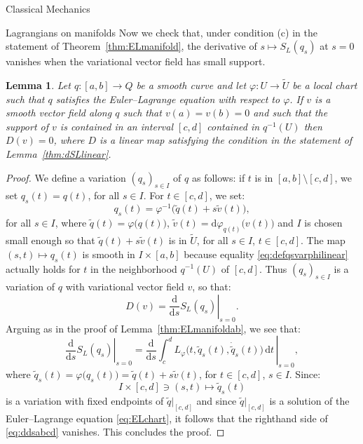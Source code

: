 \documentclass[oneside,a4paper,11pt]{amsbook}
\newcommand{\dd}{\mathrm d}
\theoremstyle{remark}\newtheorem{exercise}{Exercise}[chapter]
\theoremstyle{plain}\newtheorem{teo}{Theorem}[section]
\theoremstyle{plain}\newtheorem{lem}[teo]{Lemma}
\theoremstyle{plain}\newtheorem{prop}[teo]{Proposition}
\theoremstyle{plain}\newtheorem{cor}[teo]{Corollary}
\theoremstyle{definition}\newtheorem{defin}[teo]{Definition}
\theoremstyle{remark}\newtheorem{rem}[teo]{Remark}
\theoremstyle{definition}\newtheorem{notation}[teo]{Notation}
\theoremstyle{definition}\newtheorem{convention}[teo]{Convention}
\theoremstyle{definition}\newtheorem{example}[teo]{Example}
\numberwithin{section}{chapter}
\numberwithin{equation}{section}
\begin{document}
\begin{chapter}{Classical Mechanics}
\begin{section}{Lagrangians on manifolds}
Now we check that, under condition (c) in the statement of Theorem~\ref{thm:ELmanifold}, the derivative
of $s\mapsto S_L(q_s)$ at $s=0$ vanishes when the variational vector field has small support.
\begin{lem}\label{thm:dSsmallsupport}
Let $q:[a,b]\to Q$ be a smooth curve and let $\varphi:U\to\widetilde U$ be a local chart such that
$q$ satisfies the Euler--Lagrange equation with respect to $\varphi$. If $v$ is a smooth vector field along
$q$ such that $v(a)=v(b)=0$ and such that the support of $v$ is contained in an interval $[c,d]$ contained in $q^{-1}(U)$
then $D(v)=0$, where $D$ is a linear map satisfying the condition in the statement of Lemma~\ref{thm:dSLlinear}.
\end{lem}
\begin{proof}
We define a variation $(q_s)_{s\in I}$ of $q$ as follows: if $t$ is in $[a,b]\setminus[c,d]$, we set
$q_s(t)=q(t)$, for all $s\in I$. For $t\in[c,d]$, we set:
\begin{equation}\label{eq:defqsvarphilinear}
q_s(t)=\varphi^{-1}\big(\tilde q(t)+s\tilde v(t)\big),
\end{equation}
for all $s\in I$, where $\tilde q(t)=\varphi\big(q(t)\big)$, $\tilde v(t)=\dd\varphi_{q(t)}\big(v(t)\big)$ and $I$ is
chosen small enough so that $\tilde q(t)+s\tilde v(t)$ is in $\widetilde U$, for all $s\in I$, $t\in[c,d]$.
The map $(s,t)\mapsto q_s(t)$ is smooth in $I\times[a,b]$ because equality \eqref{eq:defqsvarphilinear} actually
holds for $t$ in the neighborhood $q^{-1}(U)$ of $[c,d]$. Thus $(q_s)_{s\in I}$ is a variation
of $q$ with variational vector field $v$, so that:
\[D(v)=\left.\frac{\dd}{\dd s}S_L(q_s)\right\vert_{s=0}.\]
Arguing as in the proof of Lemma~\ref{thm:ELmanifoldab}, we see that:
\begin{equation}\label{eq:ddsabcd}
\left.\frac{\dd}{\dd s}S_L(q_s)\right\vert_{s=0}=\left.\frac{\dd}{\dd s}
\int_c^dL_\varphi\big(t,\tilde q_s(t),\dot{\tilde q}_s(t)\big)\,\dd t\,\right\vert_{s=0},
\end{equation}
where $\tilde q_s(t)=\varphi(q_s(t)\big)=\tilde q(t)+s\tilde v(t)$, for $t\in[c,d]$, $s\in I$. Since:
\[I\times[c,d]\ni(s,t)\longmapsto\tilde q_s(t)\]
is a variation with fixed endpoints of $\tilde q\vert_{[c,d]}$ and since $\tilde q\vert_{[c,d]}$ is a solution
of the Euler--Lagrange equation \eqref{eq:ELchart}, it follows that the righthand side of \eqref{eq:ddsabcd} vanishes.
This concludes the proof.
\end{proof}


\end{section}
\end{chapter}
\end{document}
